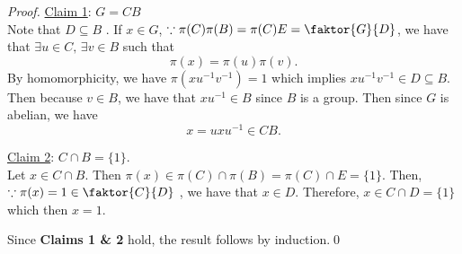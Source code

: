 \begin{proof}
  \noindent\underline{Claim 1}: $G = CB$ \\
  Note that $D \subseteq B$ . If $x \in G$, $\because \pi(C) \pi(B) = \pi(C) E = \faktor{G}{D}$, we have that $\exists u \in C, \, \exists v \in B$ such that
  \begin{equation*}
    \pi(x) = \pi(u)\pi(v).
  \end{equation*}
  By homomorphicity, we have $\pi(xu^{-1}v^{-1}) = 1$ which implies $xu^{-1}v^{-1} \in D \subseteq B$. Then because $v \in B$, we have that $xu^{-1} \in B$ since $B$ is a group. Then since $G$ is abelian, we have
  \begin{equation*}
    x = u x u^{-1} \in CB.
  \end{equation*}

  \noindent\underline{Claim 2}: $C \cap B = \{1\}$. \\
  Let $x \in C \cap B$. Then $\pi(x) \in \pi(C) \cap \pi(B) = \pi(C) \cap E = \{1\}$. Then, $\because \pi(x) = 1 \in \faktor{C}{D}$ , we have that $x \in D$. Therefore, $x \in C \cap D = \{1\}$ which then $x = 1$.

  Since \textbf{Claims 1 \& 2} hold, the result follows by induction.\qed 
\end{proof}



